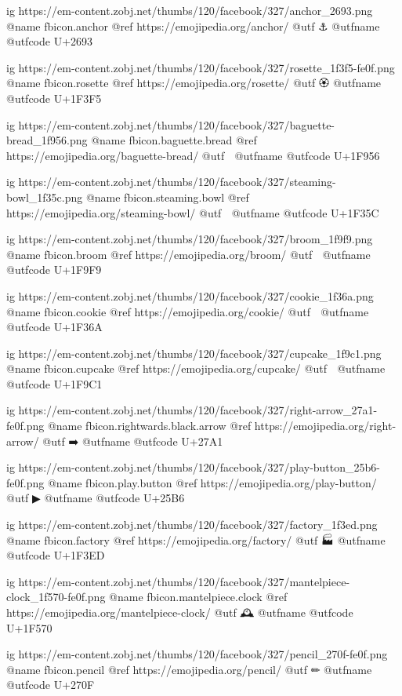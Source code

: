 	ig https://em-content.zobj.net/thumbs/120/facebook/327/anchor_2693.png
	@name fbicon.anchor
	@ref https://emojipedia.org/anchor/
	@utf ⚓
	@utfname
	@utfcode U+2693

	ig https://em-content.zobj.net/thumbs/120/facebook/327/rosette_1f3f5-fe0f.png
	@name fbicon.rosette
	@ref https://emojipedia.org/rosette/
	@utf 🏵
	@utfname
	@utfcode U+1F3F5

	ig https://em-content.zobj.net/thumbs/120/facebook/327/baguette-bread_1f956.png
	@name fbicon.baguette.bread
	@ref https://emojipedia.org/baguette-bread/
	@utf 🥖
	@utfname
	@utfcode U+1F956

	ig https://em-content.zobj.net/thumbs/120/facebook/327/steaming-bowl_1f35c.png
	@name fbicon.steaming.bowl
	@ref https://emojipedia.org/steaming-bowl/
	@utf 🍜
	@utfname
	@utfcode U+1F35C

	ig https://em-content.zobj.net/thumbs/120/facebook/327/broom_1f9f9.png
	@name fbicon.broom
	@ref https://emojipedia.org/broom/
	@utf 🧹
	@utfname
	@utfcode U+1F9F9

	ig https://em-content.zobj.net/thumbs/120/facebook/327/cookie_1f36a.png
	@name fbicon.cookie
	@ref https://emojipedia.org/cookie/
	@utf 🍪
	@utfname
	@utfcode U+1F36A

	ig https://em-content.zobj.net/thumbs/120/facebook/327/cupcake_1f9c1.png
	@name fbicon.cupcake
	@ref https://emojipedia.org/cupcake/
	@utf 🧁
	@utfname
	@utfcode U+1F9C1

	ig https://em-content.zobj.net/thumbs/120/facebook/327/right-arrow_27a1-fe0f.png
	@name fbicon.rightwards.black.arrow
	@ref https://emojipedia.org/right-arrow/
	@utf ➡️
	@utfname
	@utfcode U+27A1

	ig https://em-content.zobj.net/thumbs/120/facebook/327/play-button_25b6-fe0f.png
	@name fbicon.play.button
	@ref https://emojipedia.org/play-button/
	@utf ▶
	@utfname
	@utfcode U+25B6

	ig https://em-content.zobj.net/thumbs/120/facebook/327/factory_1f3ed.png
	@name fbicon.factory
	@ref https://emojipedia.org/factory/
	@utf 🏭
	@utfname
	@utfcode U+1F3ED

	ig https://em-content.zobj.net/thumbs/120/facebook/327/mantelpiece-clock_1f570-fe0f.png
	@name fbicon.mantelpiece.clock
	@ref https://emojipedia.org/mantelpiece-clock/
	@utf 🕰️
	@utfname
	@utfcode U+1F570

	ig https://em-content.zobj.net/thumbs/120/facebook/327/pencil_270f-fe0f.png
	@name fbicon.pencil
	@ref https://emojipedia.org/pencil/
	@utf ✏
	@utfname
	@utfcode U+270F

